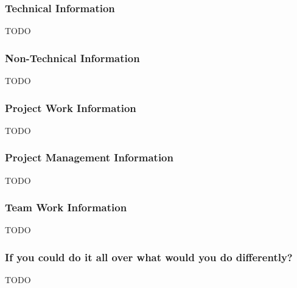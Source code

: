 \subsubsection{Technical Information}
TODO

\subsubsection{Non-Technical Information}
TODO

\subsubsection{Project Work Information}
TODO

\subsubsection{Project Management Information}
TODO

\subsubsection{Team Work Information}
TODO

\subsubsection{If you could do it all over what would you do differently?}
TODO

